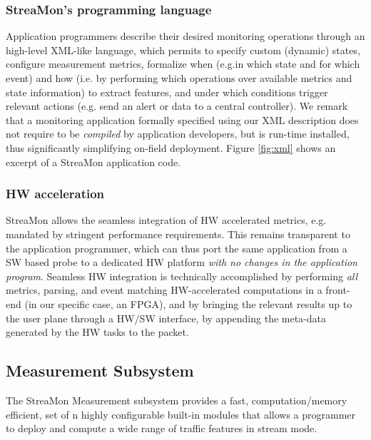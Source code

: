 \documentclass[conference,letterpaper]{sig-alternate-10pt}
\begin{document}
\subsubsection*{StreaMon's programming language} 
Application programmers describe their desired monitoring operations 
through an high-level XML-like language, which permits to specify custom (dynamic) states, configure 
measurement metrics, formalize when (e.g.in which state and for which event) and how (i.e. by 
performing which operations over available metrics and state information) to extract 
features, and under which conditions trigger relevant actions (e.g. send an alert or data 
to a central controller). We remark that a monitoring application formally specified 
using our XML description does not require to be {\em compiled} by application developers, 
but is run-time installed, thus significantly simplifying on-field deployment. Figure \ref{fig:xml} shows an excerpt of a StreaMon application code.

\subsubsection*{HW acceleration}
StreaMon allows the seamless integration of HW accelerated metrics, e.g. mandated by stringent performance requirements. This remains transparent to the application programmer, which can thus port the same application from a SW based probe to a dedicated HW platform {\em with no changes in the application program}. Seamless HW integration is technically accomplished by performing {\em all} metrics, parsing, and event matching HW-accelerated computations in a front-end (in our specific case, an FPGA), and by bringing the relevant results up to the user plane through a HW/SW interface,  by appending the meta-data generated by the HW tasks to the packet.



\subsection{Measurement Subsystem}
\label{s:metrics-features}
The StreaMon Measurement subsystem provides a fast, computation/memory efficient, set of n highly configurable built-in modules that allows a programmer to deploy and compute a wide range of traffic features in stream mode. 
\end{document}
